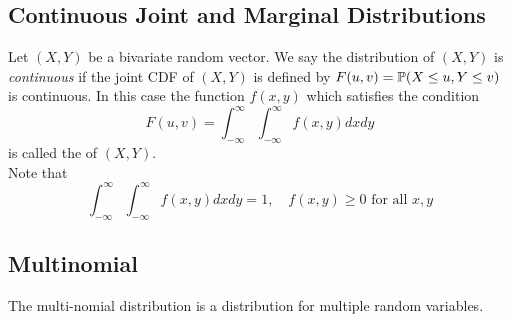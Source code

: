 \subsection{Continuous Joint and Marginal Distributions}
\begin{definition}
    Let $(X,Y)$ be a bivariate random vector. We say the distribution of $(X,Y)$ is \textit{continuous} if the joint CDF of $(X,Y)$ is defined by $F(u, v) = \mathbb P(X \leq u, Y \leq v)$ is continuous. In this case the function $f(x,y)$ which satisfies the condition
    $$
    F(u, v) = \int_{ -\infty}^{\infty} \int_{-\infty}^{\infty} f(x,y)dxdy
    $$
    is called the  of $(X,Y)$.
    \\
    Note that 
    $$
    \int_{ -\infty}^{\infty} \int_{-\infty}^{\infty} f(x,y)dxdy = 1, \quad
    f(x,y) \geq 0 \text{ for all } x,y
    $$
\end{definition}

\subsection{Multinomial}
The multi-nomial distribution is a  distribution for multiple random variables. 
